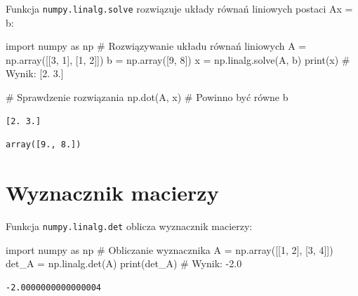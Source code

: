 \documentclass[
  letterpaper,
  DIV=11,
  numbers=noendperiod]{scrreprt}
\newenvironment{Shaded}{\begin{snugshade}}{\end{snugshade}}
\newcommand{\BuiltInTok}[1]{\textcolor[rgb]{0.00,0.23,0.31}{#1}}
\newcommand{\CommentTok}[1]{\textcolor[rgb]{0.37,0.37,0.37}{#1}}
\newcommand{\DecValTok}[1]{\textcolor[rgb]{0.68,0.00,0.00}{#1}}
\newcommand{\ImportTok}[1]{\textcolor[rgb]{0.00,0.46,0.62}{#1}}
\newcommand{\NormalTok}[1]{\textcolor[rgb]{0.00,0.23,0.31}{#1}}
\newcommand{\OperatorTok}[1]{\textcolor[rgb]{0.37,0.37,0.37}{#1}}
\begin{document}
Funkcja \texttt{numpy.linalg.solve} rozwiązuje układy równań liniowych
postaci Ax = b:

\begin{Shaded}
\begin{Highlighting}[]
\ImportTok{import}\NormalTok{ numpy }\ImportTok{as}\NormalTok{ np}
\CommentTok{\# Rozwiązywanie układu równań liniowych}
\NormalTok{A }\OperatorTok{=}\NormalTok{ np.array([[}\DecValTok{3}\NormalTok{, }\DecValTok{1}\NormalTok{], [}\DecValTok{1}\NormalTok{, }\DecValTok{2}\NormalTok{]])}
\NormalTok{b }\OperatorTok{=}\NormalTok{ np.array([}\DecValTok{9}\NormalTok{, }\DecValTok{8}\NormalTok{])}
\NormalTok{x }\OperatorTok{=}\NormalTok{ np.linalg.solve(A, b)}
\BuiltInTok{print}\NormalTok{(x)  }\CommentTok{\# Wynik: [2. 3.]}

\CommentTok{\# Sprawdzenie rozwiązania}
\NormalTok{np.dot(A, x)  }\CommentTok{\# Powinno być równe b}
\end{Highlighting}
\end{Shaded}

\begin{verbatim}
[2. 3.]
\end{verbatim}

\begin{verbatim}
array([9., 8.])
\end{verbatim}

\section{Wyznacznik macierzy}\label{wyznacznik-macierzy}

Funkcja \texttt{numpy.linalg.det} oblicza wyznacznik macierzy:

\begin{Shaded}
\begin{Highlighting}[]
\ImportTok{import}\NormalTok{ numpy }\ImportTok{as}\NormalTok{ np}
\CommentTok{\# Obliczanie wyznacznika}
\NormalTok{A }\OperatorTok{=}\NormalTok{ np.array([[}\DecValTok{1}\NormalTok{, }\DecValTok{2}\NormalTok{], [}\DecValTok{3}\NormalTok{, }\DecValTok{4}\NormalTok{]])}
\NormalTok{det\_A }\OperatorTok{=}\NormalTok{ np.linalg.det(A)}
\BuiltInTok{print}\NormalTok{(det\_A)  }\CommentTok{\# Wynik: {-}2.0}
\end{Highlighting}
\end{Shaded}

\begin{verbatim}
-2.0000000000000004
\end{verbatim}
\end{document}
